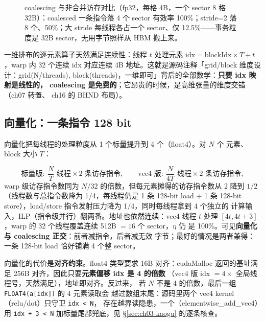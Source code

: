 \begin{figure}[htbp]
{}
\caption{coalescing 与非合并访存对比（fp32，每格 4B，一个 sector 8 格 32B）：coalesced 一条指令落 4 个 sector 有效率 100\%；stride=2 落 8 个、50\%；大 stride 每线程各占一个 sector、仅 12.5\%——事务粒度是 32B sector，无用字节照样从 HBM 搬上来。}
\label{fig:3-1}
\end{figure}

一维排布的逐元素算子天然满足连续性：线程 $t$ 处理元素
$\mathrm{idx} = \mathrm{blockIdx} \times T + t$，warp 内 32 个连续 idx
对应连续 4B 地址。这就是源码注释「grid/block 维度设计：grid(N/threads),
block(threads)，一维即可」背后的全部数学：\textbf{只要 idx 映射是线性的，
coalescing 是免费的}；它昂贵的时候，是高维张量的维度交错（ch07 转置、
ch16 的 BHND 布局）。

\subsection{向量化：一条指令 128 bit}

向量化把每线程的处理粒度从 1 个标量提升到 4 个（float4）。对 $N$ 个
元素、block 大小 $T$：

\begin{equation}
  \text{标量版}:\ \frac{N}{T} \text{ 线程} \times 2 \text{ 条访存指令},
  \qquad
  \text{vec4 版}:\ \frac{N}{4T} \text{ 线程} \times 2 \text{ 条访存指令},
\end{equation}
warp 级访存指令数同为 $N/32$ 的倍数，但每元素摊得的访存指令数从 2 降到
$1/2$（线程数与总指令数降为 1/4，每线程仍是 1 条 128-bit load + 1 条
128-bit store），load/store 指令发射压力降为 1/4，同时每线程拿到 4 个独立的
计算输入，ILP（指令级并行）翻两番。地址也依然连续：vec4 线程 $t$ 处理
$[4t, 4t+3]$，warp 的 32 个线程覆盖连续 512B $= 16$ 个 sector，$\eta$ 仍
是 100\%。可见\textbf{向量化与 coalescing 正交}：前者减指令，后者减无效
字节；最好的情况是两者兼得：一条 128-bit load 恰好铺满 4 个整 sector。

向量化的代价是\textbf{对齐约束}。float4 类型要求 16B 对齐：cudaMalloc
返回的基址满足 256B 对齐，因此只要\textbf{元素偏移 idx 是 4 的倍数}
（vec4 版 idx $= 4 \times$ 全局线程号，天然满足），地址即对齐。反过来，
若 $N$ 不是 4 的倍数，最后一组 \texttt{FLOAT4\allowbreak{}(a[idx])} 的 4 元素读取会
越过数组末尾：源码里两个 vec4 kernel（relu/dot）只守卫 \texttt{idx < N}，
存在越界读隐患，一个（elementwise\_add\_vec4）用 \texttt{idx + 3 < N}
加标量尾部兜底，见 \S\ref{sec:ch03-kaogu} 的逐条核查。

